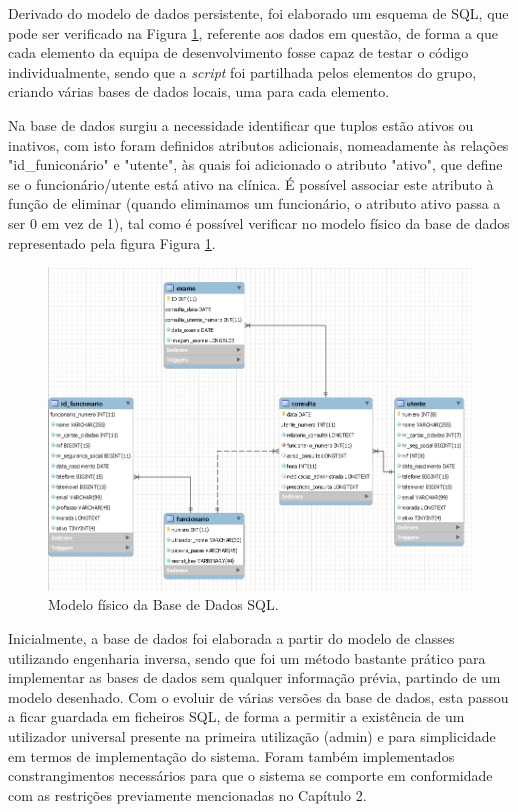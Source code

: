 \documentclass[11pt,a4paper,twoside]{report}
\begin{document}
Derivado do modelo de dados persistente, foi elaborado um esquema de SQL, que pode ser verificado na Figura \ref{fig:modelbasedados}, referente aos dados em questão, de forma a que cada elemento da equipa de desenvolvimento fosse capaz de testar o código individualmente, sendo que a \textit{script} foi partilhada pelos elementos do grupo, criando várias bases de dados locais, uma para cada elemento.

Na base de dados surgiu a necessidade identificar que tuplos estão ativos ou inativos, com isto foram definidos atributos adicionais, nomeadamente às relações "id\_funiconário" e "utente",  às quais foi adicionado o atributo "ativo", que define se o funcionário/utente está ativo na clínica. É possível associar este atributo à função de eliminar (quando eliminamos um funcionário, o atributo ativo passa a ser 0 em vez de 1), tal como é possível verificar no modelo físico da base de dados representado pela figura Figura \ref{fig:modelbasedados}.

\begin{figure}[H]
	\centering
	\includegraphics[width=0.8\linewidth]{image/model.png}
	\caption{Modelo físico da Base de Dados SQL.}
	\label{fig:modelbasedados}
\end{figure}

Inicialmente, a base de dados foi elaborada a partir do modelo de classes utilizando engenharia inversa, sendo que foi um método bastante prático para implementar as bases de dados sem qualquer informação prévia, partindo de um modelo desenhado.
Com o evoluir de várias versões da base de dados, esta passou a ficar guardada em ficheiros SQL, de forma a permitir a existência de um utilizador universal presente na primeira utilização (admin) e para simplicidade em termos de implementação do sistema.
Foram também implementados constrangimentos necessários para que o sistema se comporte em conformidade com as restrições previamente mencionadas no Capítulo 2.
\end{document}
